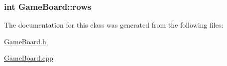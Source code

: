 \subsubsection[{rows}]{\setlength{\rightskip}{0pt plus 5cm}int Game\+Board\+::rows\hspace{0.3cm}{\ttfamily [protected]}}\label{class_game_board_a83b7f30682f1312a911e036b70c1c6d6}


The documentation for this class was generated from the following files\+:\begin{DoxyCompactItemize}
\item 
\hyperlink{_game_board_8h}{Game\+Board.\+h}\item 
\hyperlink{_game_board_8cpp}{Game\+Board.\+cpp}\end{DoxyCompactItemize}
